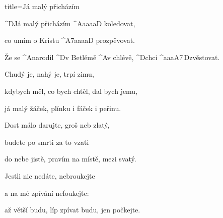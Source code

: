 \begin{song}{title=\predtitle\centering Já malý přicházím \\\large   \vspace*{-0.3cm}}  %
\begin{centerjustified}
\nejnejvetsi

\sloka
	^{D}Já malý přicházím ^{A{\color{white}aaaa}D\,\,}koledovat,

	co umím o Kristu ^{A7{\color{white}aaaa}D\,\,}prozpěvovat.

	Že se ^{A}narodil ^{D}v Betlémě ^{A}v chlévě, ^{D}chci ^{{\color{white}aaa}A7\,D}zvěstovat.

\sloka
	Chudý je, nahý je, trpí zimu,

	kdybych měl, co bych chtěl, dal bych jemu,

	já malý žáček, plínku i fáček i peřinu.

\sloka
	Dost málo darujte, groš neb zlatý,

	budete po smrti za to vzati

	do nebe jistě, pravím na místě, mezi svatý.


\sloka
	Jestli nic nedáte, nebroukejte

	a na mé zpívání nefoukejte:

	až větší budu, líp zpívat budu, jen počkejte.


\end{centerjustified}
\setcounter{Slokočet}{0}
\end{song}

